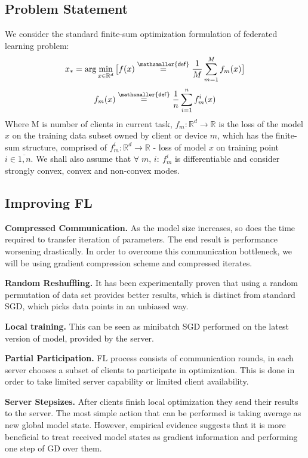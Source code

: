 \documentclass{article}
\newcommand*{\defeq}{\stackrel{\mathsmaller{\mathsf{def}}}{=}}
\begin{document}
\subsection{Problem Statement}
We consider the standard finite-sum optimization formulation of
federated learning problem:
\begin{equation}
    x_* = \arg\min_{x \in \mathbb{R}^d}\big[f(x) \defeq \frac{1}{M}\sum_{m=1}^M f_m(x) \big]
    \end{equation}
    \[f_m(x) \defeq \frac{1}{n}\sum_{i = 1}^n f_m^i(x)\]
Where M is number of clients in current task, $f_m:\mathbb{R}^d \rightarrow \mathbb{R}$ is the loss of the model $x$ on the training data subset owned by client or device $m$, which has the finite-sum structure, comprised of $f_m^i: \mathbb{R}^d \rightarrow \mathbb{R}$ - loss of model $x$ on training point $i \in \overline{1, n}$. We shall also assume that $ \forall \; m,\, i:\: f_m^i$ is differentiable and consider strongly convex, convex and non-convex modes.

\subsection{Improving FL}

\textbf{Compressed Communication.} As the model size increases, so does the time required to transfer iteration of parameters. The end result is performance worsening drastically. In order to overcome this communication bottleneck, we will be using gradient compression scheme and compressed iterates.
\par
\textbf{Random Reshuffling.} It has been experimentally proven that using a random permutation of data set provides better results, which is distinct from standard SGD, which picks data points in an unbiased way.
\par
\textbf{Local training.} This can be seen as minibatch SGD performed on the latest version of model, provided by the server.
\par
\textbf{Partial Participation.} FL process consists of communication rounds, in each server chooses a subset of clients to participate in optimization. This is done in order to take limited server capability or limited client availability.
\par
\textbf{Server Stepsizes.} After clients finish local optimization they send their results to the server. The most simple action that can be performed is taking average as new global model state. However, empirical evidence suggests that it is more beneficial to treat received model states as gradient information and performing one step of GD over them.
\end{document}
